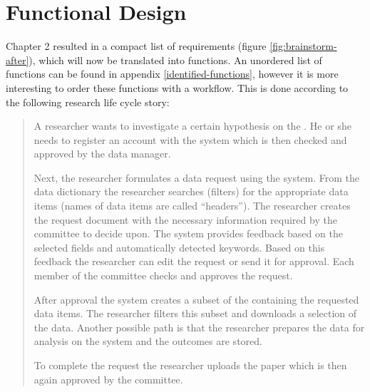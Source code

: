 \section{Functional Design}
\label{functional-design}

Chapter 2 resulted in a compact list of requirements (figure \ref{fig:brainstorm-after}), which will now be translated into functions.
An unordered list of functions can be found in appendix \ref{identified-functions}, however it is more interesting to order these functions with a workflow.
This is done according to the following research life cycle story:

\begin{quotation}
	\noindent{} A researcher wants to investigate a certain hypothesis on the \projectdata{}.
	He or she needs to register an account with the system which is then checked and approved by the data manager.
	
	Next, the researcher formulates a data request using the system.
	From the data dictionary the researcher searches (filters) for the appropriate data items (names of data items are called ``headers'').
	The researcher creates the request document with the necessary information required by the committee to decide upon.
	The system provides feedback based on the selected fields and automatically detected keywords.
	Based on this feedback the researcher can edit the request or send it for approval.
	Each member of the committee checks and approves the request.
	
	After approval the system creates a subset of the \projectdata{} containing the requested data items.
	The researcher filters this subset and downloads a selection of the data.
	Another possible path is that the researcher prepares the data for analysis on the system and the outcomes are stored.
	
	To complete the request the researcher uploads the paper which is then again approved by the committee.
\end{quotation}

